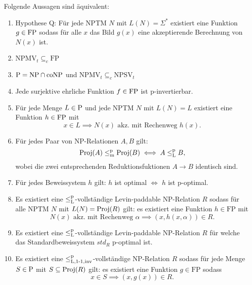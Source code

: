 \begin{theorem}\label{thm:q}
    Folgende Aussagen sind äquivalent:
    \begin{enumerate}
        \item Hypothese Q: Für jede NPTM $N$ mit $L(N)=\Sigma^*$ existiert eine Funktion $g\in\FP$ sodass für alle $x$ das Bild $g(x)$ eine akzeptierende Berechnung von $N(x)$ ist.
        \item $\mathrm{NPMV}_t\subseteq_c \mathrm{FP}$
        \item $\P=\NP\cap\coNP$ und $\mathrm{NPMV}_t\subseteq_c \mathrm{NPSV}_t$
        \item Jede surjektive ehrliche Funktion $f\in\FP$ ist p-invertierbar. %
        \item Für jede Menge $L\in \P$  und jede NPTM $N$ mit $L(N)=L$ existiert eine Funktion $h\in \FP$ mit 
            \[ x\in L \implies N(x) \text{ akz. mit Rechenweg $h(x)$}. \]
        \item Für jedes Paar von NP-Relationen $A, B$ gilt:
            \[ \Proj(A) \leqmp \Proj(B) \iff A \leqlp B, \]
            wobei die zwei entsprechenden Reduktionsfuktionen $A\to B$ identisch sind.
        \item Für jedes Beweissystem $h$ gilt: $h$ ist optimal $\iff$ $h$ ist p-optimal. 
        \item Es existiert eine $\leqlp$-vollständige Levin-paddable NP-Relation $R$ sodass für alle NPTM $N$ mit $L(N)=\Proj(R)$ gilt: es existiert eine Funktion $h\in\mathrm{FP}$ mit
            \[ N(x) \text{ akz. mit Rechenweg $\alpha$} \implies (x,h(x,\alpha))\in R. \]
        \item Es existiert eine $\leqlp$-vollständige Levin-paddable NP-Relation $R$ für welche das Standardbeweissystem $\mathit{std}_R$ p-optimal ist.
        \item Es existiert eine $\leq_\mathrm{L,1\mhyphen1,inv}^\mathrm p$-vollständige NP-Relation $R$ sodass für jede Menge $S\in \P$ mit $S\subseteq \Proj(R)$ gilt: es existiert eine Funktion $g\in\mathrm{FP}$ sodass
            \[ x\in S \implies (x, g(x))\in R. \]
    \end{enumerate}
\end{theorem}
